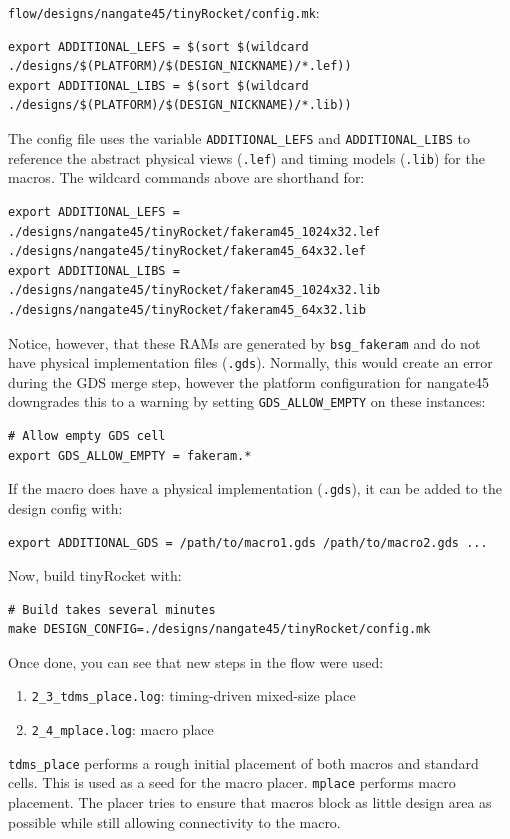 \documentclass[a4paper,12pt,twoside]{article}
\begin{document}
\texttt{flow/designs/nangate45/tinyRocket/config.mk}:
\begin{verbatim}
export ADDITIONAL_LEFS = $(sort $(wildcard ./designs/$(PLATFORM)/$(DESIGN_NICKNAME)/*.lef))
export ADDITIONAL_LIBS = $(sort $(wildcard ./designs/$(PLATFORM)/$(DESIGN_NICKNAME)/*.lib))
\end{verbatim}
The config file uses the variable \texttt{ADDITIONAL\_LEFS} and \texttt{ADDITIONAL\_LIBS} to reference the abstract physical views (\texttt{.lef}) and timing models (\texttt{.lib}) for the macros. The wildcard commands above are shorthand for:
\begin{verbatim}
export ADDITIONAL_LEFS = ./designs/nangate45/tinyRocket/fakeram45_1024x32.lef ./designs/nangate45/tinyRocket/fakeram45_64x32.lef
export ADDITIONAL_LIBS = ./designs/nangate45/tinyRocket/fakeram45_1024x32.lib ./designs/nangate45/tinyRocket/fakeram45_64x32.lib
\end{verbatim}
Notice, however, that these RAMs are generated by \texttt{bsg\_fakeram} and do not have physical implementation files (\texttt{.gds}). Normally, this would create an error during the GDS merge step, however the platform configuration for nangate45 downgrades this to a warning by setting \texttt{GDS\_ALLOW\_EMPTY} on these instances:
\begin{verbatim}
# Allow empty GDS cell
export GDS_ALLOW_EMPTY = fakeram.*
\end{verbatim}
If the macro does have a physical implementation (\texttt{.gds}), it can be added to the design config with:
\begin{verbatim}
export ADDITIONAL_GDS = /path/to/macro1.gds /path/to/macro2.gds ...
\end{verbatim}
Now, build tinyRocket with:
\begin{verbatim}
# Build takes several minutes
make DESIGN_CONFIG=./designs/nangate45/tinyRocket/config.mk
\end{verbatim}
Once done, you can see that new steps in the flow were used:
\begin{enumerate}
    \item \texttt{2\_3\_tdms\_place.log}: timing-driven mixed-size place
    \item \texttt{2\_4\_mplace.log}: macro place
\end{enumerate}
\texttt{tdms\_place} performs a rough initial placement of both macros and standard cells. This is used as a seed for the macro placer. \texttt{mplace} performs macro placement. The placer tries to ensure that macros block as little design area as possible while still allowing connectivity to the macro.
\end{document}
